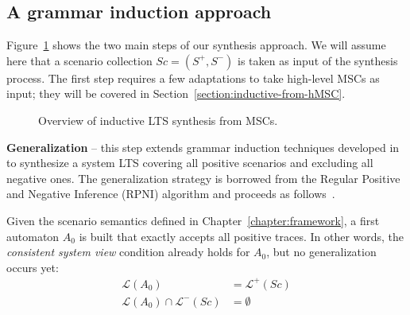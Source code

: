 
\subsection{A grammar induction approach\label{subsection:inductive-synthesis-approach}}

Figure~\ref{image:inductive-synthesis-overview} shows the two main steps of our synthesis approach. We will assume here that a scenario collection $Sc = (S^+, S^-)$ is taken as input of the synthesis process. The first step requires a few adaptations to take high-level MSCs as input; they will be covered in Section~\ref{section:inductive-from-hMSC}.

\begin{figure}\centering
  \caption{Overview of inductive LTS synthesis from MSCs.\label{image:inductive-synthesis-overview}}
\end{figure}

\noindent \textbf{Generalization} -- this step extends grammar induction techniques developed in \cite{Oncina:1992} to synthesize a system LTS covering all positive scenarios and excluding all negative ones. The generalization strategy is borrowed from the Regular Positive and Negative Inference (RPNI) algorithm and proceeds as follows~\cite{Oncina:1992}.

Given the scenario semantics defined in Chapter~\ref{chapter:framework}, a first automaton $A_0$ is built that exactly accepts all positive traces. In other words, the \emph{consistent system view} condition already holds for $A_0$, but no generalization occurs yet:
\begin{align*}
\mathcal{L}(A_0) &= \mathcal{L}^+(Sc)\\
\mathcal{L}(A_0) \cap \mathcal{L}^-(Sc) &= \emptyset
\end{align*}

